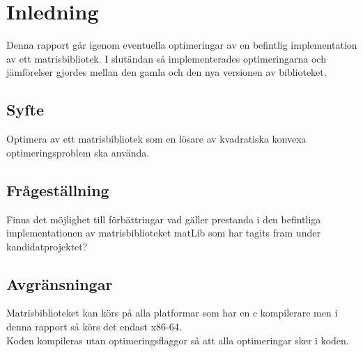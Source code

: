 \section{Inledning}
	Denna rapport går igenom eventuella optimeringar av en befintlig implementation av ett matrisbibliotek. I slutändan så implementerades optimeringarna och jämförelser gjordes mellan den gamla och den nya versionen av biblioteket. 
	\subsection{Syfte}
	Optimera  av ett matrisbibliotek som en lösare av kvadratiska konvexa optimeringsproblem ska använda. 
	\subsection{Frågeställning}
	Finns det möjlighet till förbättringar vad gäller prestanda i den befintliga implementationen av matrisbiblioteket matLib som har tagits fram under kandidatprojektet?
	\subsection{Avgränsningar}
	Matrisbiblioteket kan körs på alla platformar som har en c kompilerare men i denna rapport så körs det endast x86-64. 
	\\
	Koden kompileras utan optimeringsflaggor så att alla optimeringar sker i koden. 
	